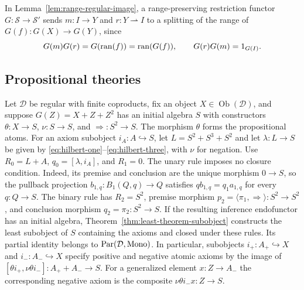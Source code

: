 In Lemma~\ref{lem:range-regular-image}, a range-preserving
restriction functor $G:\mathcal S\to\mathcal S'$ sends
$m:I\to Y$ and $r:Y\rightharpoonup I$ to a splitting of the
range of $G(f):G(X)\to G(Y)$, since
\[
 G(m)G(r)=G(\operatorname{ran}(f))=\operatorname{ran}(G(f)),\qquad G(r)G(m)=1_{G(I)}.
\]

\subsection{Propositional theories}
\label{app:propositional-theories}

Let $\mathcal D$ be regular with finite coproducts, fix an
object $X\in\operatorname{Ob}(\mathcal D)$, and suppose
$G(Z)=X+Z+Z^2$ has an initial algebra
$S$ with constructors $\theta:X\to S$, $\nu:S\to S$, and
${\Rightarrow}:S^2\to S$. The morphism $\theta$ forms the propositional atoms. For an axiom subobject
$i_A:A\hookrightarrow S$, let $L=S^2+S^3+S^2$ and let
$\lambda:L\to S$ be given by
\eqref{eq:hilbert-one}--\eqref{eq:hilbert-three}, with $\nu$ for
negation. Use $R_0=L+A$, $q_0=[\lambda,i_A]$, and $R_1=0$.
The unary rule imposes no closure condition. Indeed, its premise and
conclusion are the unique morphism $0\to S$, so the pullback
projection $b_{1,q}:B_1(Q,q)\to Q$ satisfies $q b_{1,q}=q_1a_{1,q}$
for every $q:Q\to S$. The binary rule has $R_2=S^2$, premise morphism
$p_2=\langle\pi_1,\Rightarrow\rangle:S^2\to S^2$, and conclusion
morphism $q_2=\pi_2:S^2\to S$.
If the resulting inference endofunctor has an initial algebra,
Theorem~\ref{thm:least-theorem-subobject} constructs the least
subobject of $S$ containing the axioms and closed under these rules.
Its partial identity belongs to $\operatorname{Par}(\mathcal D,\operatorname{Mono})$.
In particular, subobjects $i_+:A_+\hookrightarrow X$ and
$i_-:A_-\hookrightarrow X$ specify positive and negative atomic
axioms by the image of
$[\theta i_+,\nu\theta i_-]:A_++A_-\to S$. For a generalized
element $x:Z\to A_-$ the corresponding negative axiom is the
composite $\nu\theta i_-x:Z\to S$.

